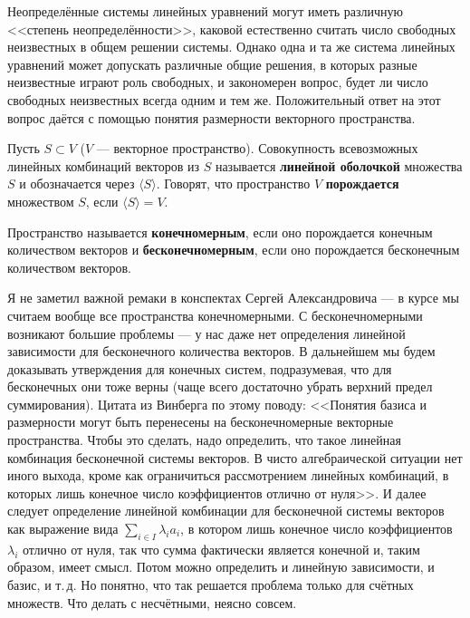 \begin{remark}[из Винберга]
    Неопределённые системы линейных уравнений могут иметь различную <<степень неопределённости>>, каковой естественно считать число свободных неизвестных в общем решении системы. Однако одна и та же система линейных уравнений может допускать различные общие решения, в которых разные неизвестные играют роль свободных, и закономерен вопрос, будет ли число свободных неизвестных всегда одним и тем же. Положительный ответ на этот вопрос даётся с помощью понятия размерности векторного пространства.
\end{remark}

\begin{definition}
    Пусть $S \subset V$ ($V$ --- векторное пространство). Совокупность всевозможных линейных комбинаций векторов из $S$ называется \textbf{линейной оболочкой} множества $S$ и обозначается через $\langle S\rangle$. Говорят, что пространство $V$ \textbf{порождается} множеством $S$, если $\langle S\rangle = V$.
\end{definition}

\begin{definition}
    Пространство называется  \textbf{конечномерным}, если оно порождается конечным количеством векторов и \textbf{бесконечномерным}, если оно порождается бесконечным количеством векторов.
\end{definition}

\begin{remark}
    Я не заметил важной ремаки в конспектах Сергей Александровича --- в курсе мы считаем вообще все пространства конечномерными. С бесконечномерными возникают большие проблемы --- у нас даже нет определения линейной зависимости для бесконечного количества векторов. В дальнейшем мы будем доказывать утверждения для конечных систем, подразумевая, что для бесконечных они тоже верны (чаще всего достаточно убрать верхний предел суммирования). Цитата из Винберга по этому поводу: <<Понятия базиса и размерности могут быть перенесены на бесконечномерные векторные пространства. Чтобы это сделать, надо определить, что такое линейная комбинация бесконечной системы векторов. В чисто алгебраической ситуации нет иного выхода, кроме как ограничиться рассмотрением линейных комбинаций, в которых лишь конечное число коэффициентов отлично от нуля>>. И далее следует определение линейной комбинации для бесконечной системы векторов как выражение вида $\displaystyle \sum_{i \in I}\lambda_ia_i$, в котором лишь конечное число коэффициентов $\lambda_i$ отлично от нуля, так что сумма фактически является конечной и, таким образом, имеет смысл. Потом можно определить и линейную зависимости, и базис, и т.\,д. Но понятно, что так решается проблема только для счётных множеств. Что делать с несчётными, неясно совсем.
\end{remark}

